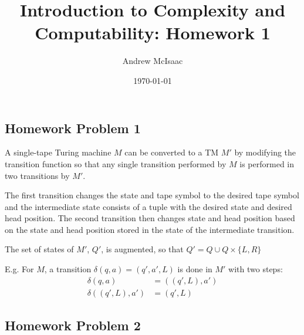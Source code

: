 \documentclass{article}
\author{Andrew McIsaac}
\title{Introduction to Complexity and Computability: Homework 1}
\date{\today}
\begin{document}
\maketitle

\subsection*{Homework Problem 1}

A single-tape Turing machine $M$ can be converted to a TM $M'$ by
modifying the transition function so that any single transition performed by
$M$ is performed in two transitions by $M'$.

The first transition changes the state and tape symbol to the desired tape
symbol and the intermediate state consists of a tuple with the desired state and
desired head position. The second transition then changes state and head
position based on the state and head position stored in the state of the
intermediate transition.

The set of states of $M'$, $Q'$, is augmented, so that $Q' = Q \cup Q \times \{L,R\}$

E.g. For $M$, a transition $\delta{(q, a)} = (q', a', L)$ is done in $M'$ with
two steps:
\begin{align*}
	\delta{(q,a)} &= ((q', L), a') \\
	\delta{((q', L), a')} &= (q', L)
\end{align*}	

\subsection*{Homework Problem 2}
\end{document}
